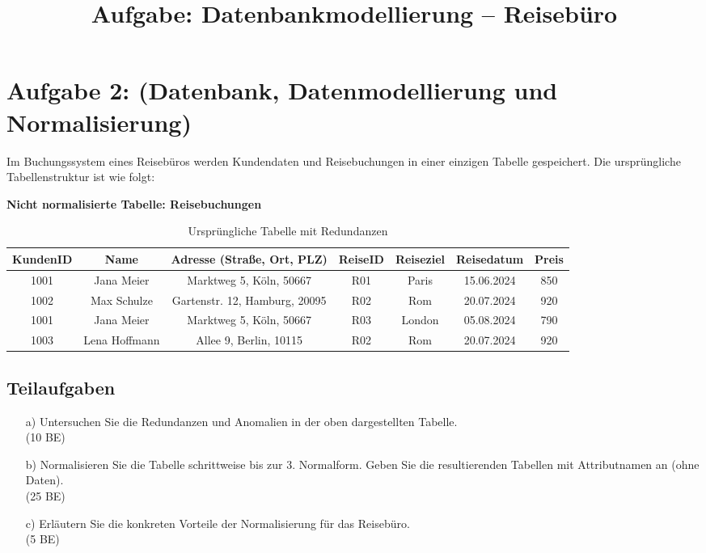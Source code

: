 \documentclass{article}
\title{Aufgabe: Datenbankmodellierung – Reisebüro}
\author{}
\date{}
\begin{document}
	\maketitle
	
	\section*{Aufgabe 2: (Datenbank, Datenmodellierung und Normalisierung)}
	
	Im Buchungssystem eines Reisebüros werden Kundendaten und Reisebuchungen in einer einzigen Tabelle gespeichert. Die ursprüngliche Tabellenstruktur ist wie folgt:
	
	\textbf{Nicht normalisierte Tabelle: Reisebuchungen}
	
	\begin{table}[h]
		\centering
		\small
		\begin{tabular}{|c|c|c|c|c|c|c|}
			\hline
			KundenID & Name & Adresse (Straße, Ort, PLZ) & ReiseID & Reiseziel & Reisedatum & Preis \\
			\hline
			1001 & Jana Meier & Marktweg 5, Köln, 50667 & R01 & Paris & 15.06.2024 & 850 \\
			1002 & Max Schulze & Gartenstr. 12, Hamburg, 20095 & R02 & Rom & 20.07.2024 & 920 \\
			1001 & Jana Meier & Marktweg 5, Köln, 50667 & R03 & London & 05.08.2024 & 790 \\
			1003 & Lena Hoffmann & Allee 9, Berlin, 10115 & R02 & Rom & 20.07.2024 & 920 \\
			\hline
		\end{tabular}
		\caption*{\small Ursprüngliche Tabelle mit Redundanzen}
	\end{table}
	
	\subsection*{Teilaufgaben}
	
	\begin{enumerate}
		\item[a)] Untersuchen Sie die Redundanzen und Anomalien in der oben dargestellten Tabelle.\\ (10 BE)
		\item[b)] Normalisieren Sie die Tabelle schrittweise bis zur 3. Normalform. Geben Sie die resultierenden Tabellen mit Attributnamen an (ohne Daten).\\ (25 BE)
		\item[c)] Erläutern Sie die konkreten Vorteile der Normalisierung für das Reisebüro.\\ (5 BE)
	\end{enumerate}
	
\end{document}
